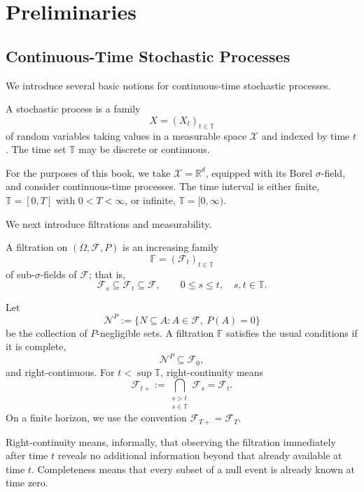 \chapter{Preliminaries}

\section{Continuous-Time Stochastic Processes}

We introduce several basic notions for continuous-time stochastic processes.

\begin{de}
A stochastic process is a family
\[
X=(X_t)_{t\in\mathbb T}
\]
of random variables taking values in a measurable space \(\mathcal X\) and indexed by time \(t\). The time set \(\mathbb T\) may be discrete or continuous.
\end{de}

\begin{remark}
For the purposes of this book, we take \(\mathcal X=\mathbb R^d\), equipped with its Borel \(\sigma\)-field, and consider continuous-time processes. The time interval is either finite, \(\mathbb T=[0,T]\) with \(0<T<\infty\), or infinite, \(\mathbb T=[0,\infty)\).
\end{remark}

We next introduce filtrations and measurability.

\begin{de}
A filtration on \((\Omega,\mathcal F,P)\) is an increasing family
\[
\mathbb F=(\mathcal F_t)_{t\in\mathbb T}
\]
of sub-\(\sigma\)-fields of \(\mathcal F\); that is,
\[
\mathcal F_s\subseteq\mathcal F_t\subseteq\mathcal F,
\qquad 0\le s\le t,
\quad s,t\in\mathbb T.
\]
\end{de}

\begin{de}
Let
\[
\mathcal N^P:=\{N\subseteq A:A\in\mathcal F,\ P(A)=0\}
\]
be the collection of \(P\)-negligible sets. A filtration \(\mathbb F\) satisfies the usual conditions if it is complete,
\[
\mathcal N^P\subseteq\mathcal F_0,
\]
and right-continuous. For \(t<\sup\mathbb T\), right-continuity means
\[
\mathcal F_{t+}
:=\bigcap_{\substack{s>t\\s\in\mathbb T}}\mathcal F_s
=\mathcal F_t.
\]
On a finite horizon, we use the convention \(\mathcal F_{T+}=\mathcal F_T\).
\end{de}

\begin{remark}
Right-continuity means, informally, that observing the filtration immediately after time \(t\) reveals no additional information beyond that already available at time \(t\). Completeness means that every subset of a null event is already known at time zero.
\end{remark}

